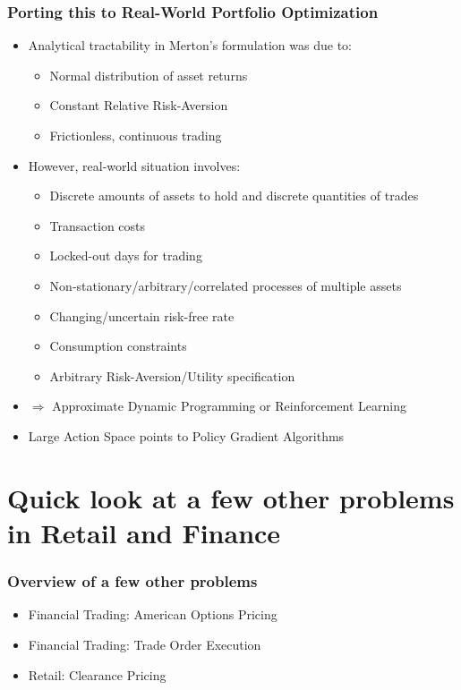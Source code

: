 \documentclass[handout]{beamer}
\begin{document}
\begin{frame}
\frametitle{Porting this to Real-World Portfolio Optimization}
\begin{itemize}
\item Analytical tractability in Merton's formulation was due to:
\begin{itemize}
\item Normal distribution of asset returns
\item Constant Relative Risk-Aversion
\item Frictionless, continuous trading
\end{itemize}
\item However, real-world situation involves:
\begin{itemize}
\item Discrete amounts of assets to hold and discrete quantities of trades
\item Transaction costs
\item Locked-out days for trading
\item Non-stationary/arbitrary/correlated processes of multiple assets
\item Changing/uncertain risk-free rate
\item Consumption constraints
\item Arbitrary Risk-Aversion/Utility specification
\end{itemize}
\item $\Rightarrow$ Approximate Dynamic Programming or Reinforcement Learning
\item Large Action Space points to Policy Gradient Algorithms
\end{itemize}
\end{frame}

\section{Quick look at a few other problems in Retail and Finance}

\begin{frame}
\frametitle{Overview of a few other problems}
\pause
\begin{itemize}[<+->]
\item Financial Trading: American Options Pricing
\item Financial Trading: Trade Order Execution
\item Retail: Clearance Pricing 
\end{itemize}
\end{frame}
\end{document}
